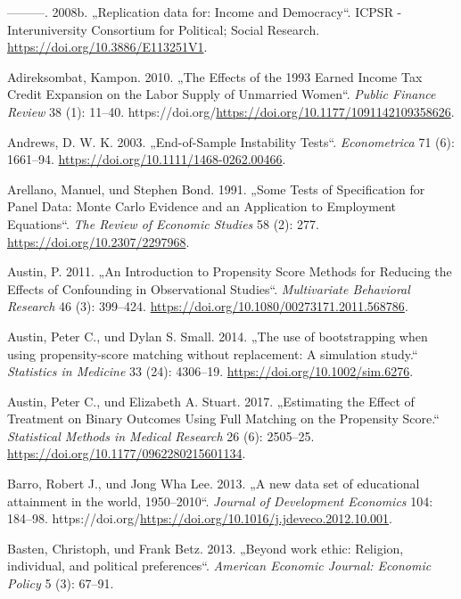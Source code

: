 \documentclass[
  a4paper,
  DIV=11,
  oneside]{scrreprt}
\newlength{\cslhangindent}
\newenvironment{CSLReferences}[2] %
 {\begin{list}{}{%
  \setlength{\itemindent}{0pt}
  \setlength{\leftmargin}{0pt}
  \setlength{\parsep}{0pt}
  \ifodd #1
   \setlength{\leftmargin}{\cslhangindent}
   \setlength{\itemindent}{-1\cslhangindent}
  \fi
  \setlength{\itemsep}{#2\baselineskip}}}
 {\end{list}}
\begin{document}
\begin{CSLReferences}{1}{0}
---------. 2008b. {„Replication data for: Income and Democracy``}. ICPSR
- Interuniversity Consortium for Political; Social Research.
\url{https://doi.org/10.3886/E113251V1}.

Adireksombat, Kampon. 2010. {„The Effects of the 1993 Earned Income Tax
Credit Expansion on the Labor Supply of Unmarried Women``}. \emph{Public
Finance Review} 38 (1): 11--40.
https://doi.org/\url{https://doi.org/10.1177/1091142109358626}.

Andrews, D. W. K. 2003. {„End-of-Sample Instability Tests``}.
\emph{Econometrica} 71 (6): 1661--94.
\url{https://doi.org/10.1111/1468-0262.00466}.

Arellano, Manuel, und Stephen Bond. 1991. {„Some Tests of Specification
for Panel Data: Monte Carlo Evidence and an Application to Employment
Equations``}. \emph{The Review of Economic Studies} 58 (2): 277.
\url{https://doi.org/10.2307/2297968}.

Austin, P. 2011. {„An Introduction to Propensity Score Methods for
Reducing the Effects of Confounding in Observational Studies``}.
\emph{Multivariate Behavioral Research} 46 (3): 399--424.
\url{https://doi.org/10.1080/00273171.2011.568786}.

Austin, Peter C., und Dylan S. Small. 2014. {„The use of bootstrapping
when using propensity-score matching without replacement: A simulation
study.``} \emph{Statistics in Medicine} 33 (24): 4306--19.
\url{https://doi.org/10.1002/sim.6276}.

Austin, Peter C., und Elizabeth A. Stuart. 2017. {„Estimating the Effect
of Treatment on Binary Outcomes Using Full Matching on the Propensity
Score.``} \emph{Statistical Methods in Medical Research} 26 (6):
2505--25. \url{https://doi.org/10.1177/0962280215601134}.

Barro, Robert J., und Jong Wha Lee. 2013. {„A new data set of
educational attainment in the world, 1950--2010``}. \emph{Journal of
Development Economics} 104: 184--98.
https://doi.org/\url{https://doi.org/10.1016/j.jdeveco.2012.10.001}.

Basten, Christoph, und Frank Betz. 2013. {„Beyond work ethic: Religion,
individual, and political preferences``}. \emph{American Economic
Journal: Economic Policy} 5 (3): 67--91.


\end{CSLReferences}
\end{document}
